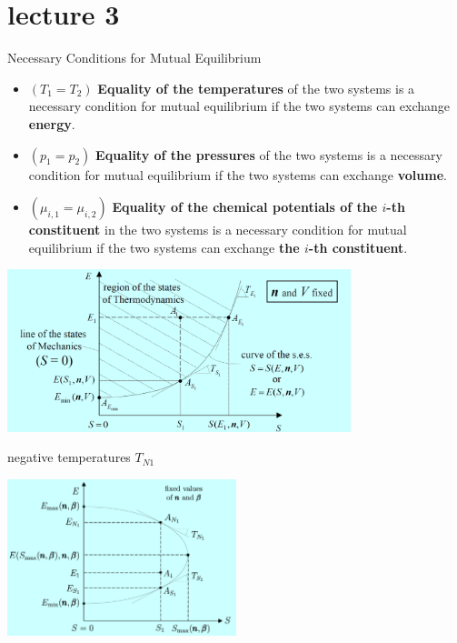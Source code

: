 \section{lecture 3}
\begin{proposition}
    Necessary Conditions for Mutual Equilibrium
    \begin{itemize}
        \item \((T_1=T_2)\)
        \textbf{Equality of the temperatures} of the two systems is a necessary condition for mutual equilibrium if the two systems can exchange \textbf{energy}.
        \item \((p_1=p_2)\)
        \textbf{Equality of the pressures} of the two systems is a necessary condition for mutual equilibrium if the two systems can exchange \textbf{volume}.
        \item \((\mu_{i,1} = \mu_{i,2})\)
        \textbf{Equality of the chemical potentials of the \(i\)-th constituent} in the two systems is a necessary condition for mutual equilibrium if the two systems can exchange \textbf{the \(i\)-th constituent}.
    \end{itemize}
\end{proposition}
\begin{minipage}{0.8\textwidth}
    \centering
    \includegraphics[width=0.75\textwidth]{chap1/3.1.png}
\end{minipage}
\begin{defn}
    negative temperatures \(T_{N1}\)

\begin{minipage}{0.8\textwidth}
    \centering
    \includegraphics[width=0.5\textwidth]{chap1/3.2.png}
\end{minipage}
\end{defn}
